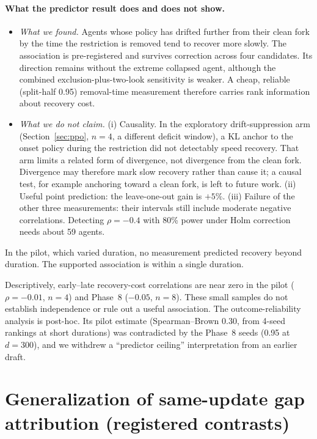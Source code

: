 \documentclass[10pt]{article} %
\begin{document}
\paragraph{What the predictor result does and does not show.}
\begin{itemize}
\item \emph{What we found.} Agents whose policy has drifted further from their clean fork by the time the restriction is removed tend to recover more slowly. The association is pre-registered and survives correction across four candidates. Its direction remains without the extreme collapsed agent, although the combined exclusion-plus-two-look sensitivity is weaker. A cheap, reliable (split-half 0.95) removal-time measurement therefore carries rank information about recovery cost.
\item \emph{What we do not claim.} (i) Causality. In the exploratory drift-suppression arm (Section~\ref{sec:ppo}, $n=4$, a different deficit window), a KL anchor to the onset policy during the restriction did not detectably speed recovery. That arm limits a related form of divergence, not divergence from the clean fork. Divergence may therefore mark slow recovery rather than cause it; a causal test, for example anchoring toward a clean fork, is left to future work. (ii) Useful point prediction: the leave-one-out gain is $+5\%$. (iii) Failure of the other three measurements: their intervals still include moderate negative correlations. Detecting $\rho=-0.4$ with 80\% power under Holm correction needs about 59 agents.
\end{itemize}
In the pilot, which varied duration, no measurement predicted recovery beyond duration. The supported association is within a single duration.

Descriptively, early--late recovery-cost correlations are near zero in the pilot ($\rho=-0.01$, $n=4$) and Phase~8 ($-0.05$, $n=8$). These small samples do not establish independence or rule out a useful association. The outcome-reliability analysis is post-hoc. Its pilot estimate (Spearman--Brown 0.30, from 4-seed rankings at short durations) was contradicted by the Phase~8 seeds (0.95 at $d=300$), and we withdrew a ``predictor ceiling'' interpretation from an earlier draft.

\section{Generalization of same-update gap attribution (registered contrasts)}\label{sec:general}
\end{document}
